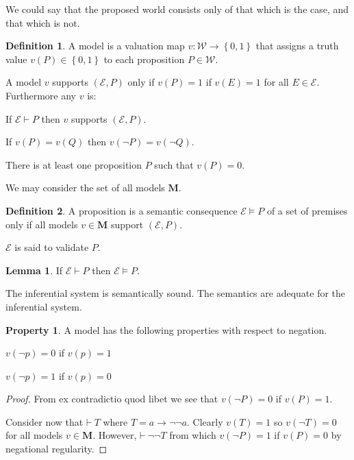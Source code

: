 \documentclass{amsbook}
\newcommand{\setsm}[1]{\left\{#1\right\}}
\newcommand{\wffs}{\mathcal W}
\newcommand{\infers}{\mathrel\vdash}
\newcommand{\theorem}{\mathord\vdash\medspace}
\newcommand{\valids}{\mathrel\vDash}
\newcommand{\then}{\mathrel\rightarrow}
\theoremstyle{definition}
\newtheorem{prop}{Property}[section]
\newtheorem{lmm}{Lemma}[section]
\newtheorem{dfn}{Definition}[section]
\begin{document}
We could say that the proposed world consists only of that which is the case, and that which is not.

\begin{dfn}
    A model is a valuation map $v: \wffs \longrightarrow \setsm{0,1}$ that assigns a truth value $v(P) \in \setsm{0,1}$ to each proposition $P \in \wffs$.

    A model $v$ supports $(\mathcal E, P)$ only if $v(P) = 1$ if $v(E) = 1$ for all $E \in \mathcal E$. Furthermore any $v$ is:
    \begin{description}[
            labelindent=\parindent,
            before={
                    \renewcommand\makelabel[1]{(##1).}
                }
        ]
        \item [inferential] If $\mathcal E \infers P$ then $v$ supports $(\mathcal E, P)$.
        \item [regular with respect to negation] If $v(P) = v(Q)$ then $v(\neg P) = v(\neg Q)$.
        \item [not trivial] There is at least one proposition $P$ such that $v(P) = 0$.
    \end{description}
    We may consider the set of all models $\mathbf M$.
\end{dfn}

\begin{dfn}
    A proposition is a semantic consequence $\mathcal E \valids P$ of a set of premises only if all models $v \in \mathbf M$ support $(\mathcal E, P)$.

    $\mathcal E$ is said to validate $P$.
\end{dfn}

\begin{lmm}
    If $\mathcal E \infers P$ then $\mathcal E \valids P$.

    The inferential system is semantically sound. The semantics are adequate for the inferential system.
\end{lmm}

\begin{prop}
    A model has the following properties with respect to negation.
    \begin{description}[
            labelindent=\parindent,
            before={
                    \renewcommand\makelabel[1]{(##1).}
                }
        ]
        \item[consistency] $v(\neg p) = 0$ if $v(p) = 1$
        \item[completeness] $v(\neg p) = 1$ if $v(p) = 0$
    \end{description}

    \begin{proof}
        From ex contradictio quod libet we see that $v(\neg P) = 0$ if $v(P) = 1$.

        Consider now that $\theorem T$ where $T = a \then \neg\neg a$. Clearly $v(T) = 1$ so $v(\neg T) = 0$ for all models $v \in \mathbf M$. However, $\theorem \neg\neg T$ from which $v(\neg P) = 1$ if $v(P) = 0$ by negational regularity.
    \end{proof}
\end{prop}
\end{document}
